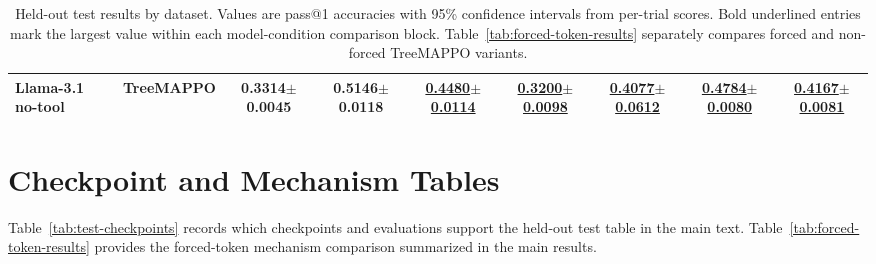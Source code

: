 \documentclass{article}
\newcommand{\ours}{TreeMAPPO\xspace}
\newcommand{\best}[1]{\textbf{\underline{#1}}}
\newcommand{\acc}[2]{#1{\scriptsize$\pm$#2}}
\begin{document}
\begin{table}[t]
{\begin{tabular}{llccccccc}
Llama-3.1 no-tool & \ours & \acc{0.3314}{0.0045} & \acc{0.5146}{0.0118} & \best{\acc{0.4480}{0.0114}} & \best{\acc{0.3200}{0.0098}} & \best{\acc{0.4077}{0.0612}} & \best{\acc{0.4784}{0.0080}} & \best{\acc{0.4167}{0.0081}} \\
\hline
\end{tabular}%
}
\caption{Held-out test results by dataset. Values are pass@1 accuracies with 95\% confidence intervals from per-trial scores. Bold underlined entries mark the largest value within each model-condition comparison block. Table~\ref{tab:forced-token-results} separately compares forced and non-forced TreeMAPPO variants.}
\label{tab:heldout-serious-details}
\end{table}

\section{Checkpoint and Mechanism Tables}
Table~\ref{tab:test-checkpoints} records which checkpoints and evaluations support the held-out test table in the main text. Table~\ref{tab:forced-token-results} provides the forced-token mechanism comparison summarized in the main results.
\end{document}
